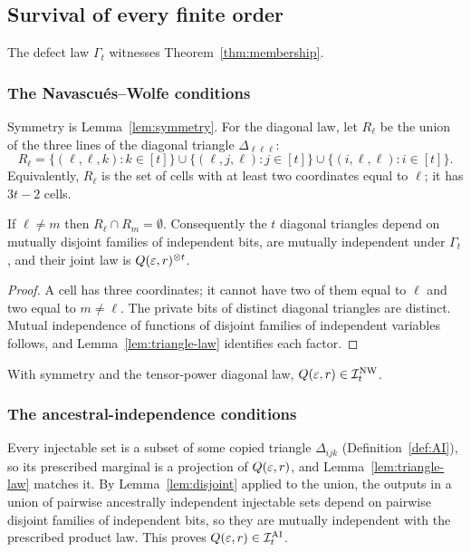 \subsection{Survival of every finite order}\label{sec:survival}

The defect law $\Gamma_t$ witnesses Theorem~\ref{thm:membership}.

\subsubsection{The Navascués--Wolfe conditions}
Symmetry is Lemma~\ref{lem:symmetry}. For the diagonal law, let $R_\ell$ be the union of the three lines of the diagonal triangle $\Delta_{\ell\ell\ell}$:
\begin{equation}\label{eq:Rl}
R_\ell=\{(\ell,\ell,k):k\in[t]\}\cup\{(\ell,j,\ell):j\in[t]\}\cup\{(i,\ell,\ell):i\in[t]\}.
\end{equation}
Equivalently, $R_\ell$ is the set of cells with at least two coordinates equal to $\ell$; it has $3t-2$ cells.

\begin{lemma}\label{lem:diag}
If $\ell\ne m$ then $R_\ell\cap R_m=\emptyset$. Consequently the $t$ diagonal triangles depend on mutually disjoint families of independent bits, are mutually independent under $\Gamma_t$, and their joint law is $Q(\varepsilon,r)^{\otimes t}$.
\end{lemma}
\begin{proof}
A cell has three coordinates; it cannot have two of them equal to $\ell$ and two equal to $m\ne\ell$. The private bits of distinct diagonal triangles are distinct. Mutual independence of functions of disjoint families of independent variables follows, and Lemma~\ref{lem:triangle-law} identifies each factor.
\end{proof}

With symmetry and the tensor-power diagonal law, $Q(\varepsilon,r)\in\mathcal I^{\mathrm{NW}}_t$.

\subsubsection{The ancestral-independence conditions}
Every injectable set is a subset of some copied triangle $\Delta_{ijk}$ (Definition~\ref{def:AI}), so its prescribed marginal is a projection of $Q(\varepsilon,r)$, and Lemma~\ref{lem:triangle-law} matches it. By Lemma~\ref{lem:disjoint} applied to the union, the outputs in a union of pairwise ancestrally independent injectable sets depend on pairwise disjoint families of independent bits, so they are mutually independent with the prescribed product law. This proves $Q(\varepsilon,r)\in\mathcal I^{\mathrm{AI}}_t$.

